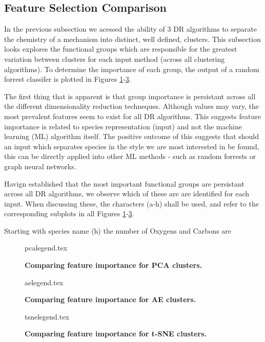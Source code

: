 \subsection{Feature Selection Comparison}\label{sec:fsclust}

In the previous subsection we acessed the ability of 3 DR algorithms to separate the chemistry of a mechanism into distinct, well defined, clusters. This subsection looks explores the functional groups which are responsible for the greatest variation between clusters for each input method (across all clustering algorithms). To determine the importance of each group, the output of a random forrest classifer is plotted in Figures \ref{fig:pcalegend}-\ref{fig:tsnelegend}.

The first thing that is apparent is that group importance is persistant across all the different dimensionality reduction techneques. Although values may vary, the most prevalent features seem to exist for all DR algorithms. This suggests feature importance is related to species representation (input) and not the machine learning (ML) algorithm itself. The positive outcome of this suggests that should an input which separates species in the style we are most interested in be foumd, this can be directly applied into other ML methods - such as random forrests or graph neural networks.

Havign established that the most important functional groups are persistant across all DR algorithms, we observe which of these are are identified for each input. When discussing these, the characters (a-h) shall be used, and refer to the corresponding subplots in all Figures \ref{fig:pcalegend}-\ref{fig:tsnelegend}.

Starting with species name (h) the number of Oxygens and Carbons are


\begin{figure}[H]
    {pcalegend.tex}
    \caption{\textbf{Comparing feature importance for PCA clusters.}}
    \label{fig:pcalegend}
\end{figure}
\begin{figure}[H]
    {aelegend.tex}
    \caption{\textbf{Comparing feature importance for AE clusters.}}
    \label{fig:aelegend}
\end{figure}
\begin{figure}[H]
    {tsnelegend.tex}
    \caption{\textbf{Comparing feature importance for t-SNE clusters.}}
    \label{fig:tsnelegend}
\end{figure}



